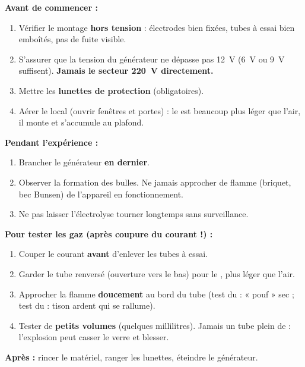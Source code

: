 \documentclass[11pt]{article}
\begin{document}
\begin{methode}
\textbf{Avant de commencer :}
\begin{enumerate}
    \item Vérifier le montage \textbf{hors tension} : électrodes bien fixées, tubes à essai bien emboîtés, pas de fuite visible.
    \item S'assurer que la tension du générateur ne dépasse pas \SI{12}{V} (\SI{6}{V} ou \SI{9}{V} suffisent). \textbf{Jamais le secteur \SI{220}{V} directement.}
    \item Mettre les \textbf{lunettes de protection} (obligatoires).
    \item Aérer le local (ouvrir fenêtres et portes) : le  est beaucoup plus léger que l'air, il monte et s'accumule au plafond.
\end{enumerate}
\textbf{Pendant l'expérience :}
\begin{enumerate}
    \item Brancher le générateur \textbf{en dernier}.
    \item Observer la formation des bulles. Ne jamais approcher de flamme (briquet, bec Bunsen) de l'appareil en fonctionnement.
    \item Ne pas laisser l'électrolyse tourner longtemps sans surveillance.
\end{enumerate}
\textbf{Pour tester les gaz (après coupure du courant !) :}
\begin{enumerate}
    \item Couper le courant \textbf{avant} d'enlever les tubes à essai.
    \item Garder le tube renversé (ouverture vers le bas) pour le , plus léger que l'air.
    \item Approcher la flamme \textbf{doucement} au bord du tube (test du  : « pouf » sec ; test du  : tison ardent qui se rallume).
    \item Tester de \textbf{petits volumes} (quelques millilitres). Jamais un tube plein de  : l'explosion peut casser le verre et blesser.
\end{enumerate}
\textbf{Après :} rincer le matériel, ranger les lunettes, éteindre le générateur.
\end{methode}
\end{document}
